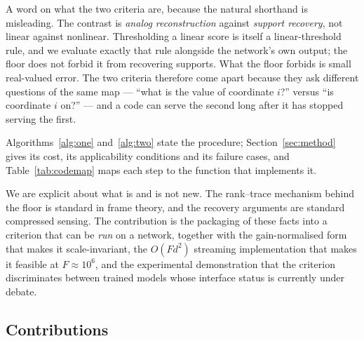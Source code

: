 \documentclass[preprint,12pt]{elsarticle}
\theoremstyle{definition}
\begin{document}
A word on what the two criteria are, because the natural shorthand is misleading. The contrast
is \emph{analog reconstruction} against \emph{support recovery}, not linear against nonlinear.
Thresholding a linear score is itself a linear-threshold rule, and we evaluate exactly that
rule alongside the network's own output; the floor does not forbid it from recovering supports.
What the floor forbids is small real-valued error. The two criteria therefore come apart
because they ask different questions of the same map --- ``what is the value of coordinate
$i$?'' versus ``is coordinate $i$ on?'' --- and a code can serve the second long after it has
stopped serving the first.

Algorithms~\ref{alg:one} and~\ref{alg:two} state the procedure; Section~\ref{sec:method}
gives its cost, its applicability conditions and its failure cases, and
Table~\ref{tab:codemap} maps each step to the function that implements it.

We are explicit about what is and is not new. The rank--trace mechanism behind the floor is
standard in frame theory, and the recovery arguments are standard compressed sensing. The
contribution is the packaging of these facts into a criterion that can be \emph{run} on a
network, together with the gain-normalised form that makes it scale-invariant, the
$O(Fd^2)$ streaming implementation that makes it feasible at $F\approx10^6$, and the
experimental demonstration that the criterion discriminates between trained models whose
interface status is currently under debate.

\subsection{Contributions}
\end{document}
